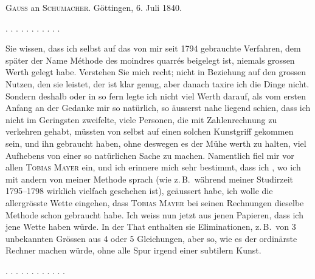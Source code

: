 \clearpage
{}
\begin{center}
\textsc{Gauss} an \textsc{Schumacher}. Göttingen, 6. Juli 1840.
\end{center}

\noindent . . . . . . . . . . .

Sie wissen, dass ich selbst auf das von mir seit 1794 gebrauchte Verfahren, dem später der Name Méthode des moindres quarrés beigelegt ist, niemals grossen Werth gelegt habe. Verstehen Sie mich recht; nicht in Beziehung auf den grossen Nutzen, den sie leistet, der ist klar genug, aber danach taxire ich die Dinge nicht. Sondern deshalb oder in so fern legte ich nicht viel Werth darauf, als vom ersten Anfang an der Gedanke mir so natürlich, so äusserst nahe liegend schien, dass ich nicht im Geringsten zweifelte, viele Personen, die mit Zahlenrechnung zu verkehren gehabt, müssten von selbst auf einen solchen Kunstgriff gekommen sein, und ihn gebraucht haben, ohne deswegen es der Mühe werth zu halten, viel Aufhebens von einer so natürlichen Sache zu machen. Namentlich fiel mir vor allen \textsc{Tobias Mayer} ein, und ich erinnere mich sehr bestimmt, dass ich , wo ich mit andern von meiner Methode sprach (wie z.\,B.\ während meiner Studirzeit 1795--1798 wirklich vielfach geschehen ist), geäussert habe, ich wolle die allergrösste Wette eingehen, dass \textsc{Tobias Mayer} bei seinen Rechnungen dieselbe Methode schon gebraucht habe. Ich weiss nun jetzt aus jenen Papieren, dass ich jene Wette  haben würde. In der That enthalten sie Eliminationen, z.\,B.\ von 3 unbekannten Grössen aus 4 oder 5 Gleichungen, aber so, wie es der ordinärste Rechner machen würde, ohne alle Spur irgend einer subtilern Kunst.

\noindent . . . . . . . . . . . .

